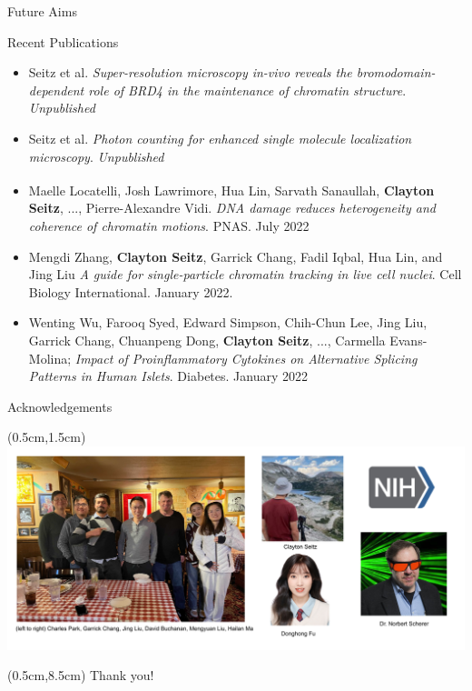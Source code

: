 \documentclass{beamer}					%
\begin{document}
\begin{frame}{Future Aims}

\end{frame}

\begin{frame}{Recent Publications}

\begin{itemize}
\item Seitz et al. \textit{Super-resolution microscopy in-vivo reveals the bromodomain-dependent role of BRD4 in the maintenance of chromatin structure}. \textit{Unpublished}

\item Seitz et al. \textit{Photon counting for enhanced single molecule localization microscopy}. \textit{Unpublished}

\item Maelle Locatelli\textsuperscript{\textdagger}, Josh Lawrimore\textsuperscript{\textdagger}, Hua Lin\textsuperscript{\textdagger}, Sarvath Sanaullah, \textbf{Clayton Seitz}, ..., Pierre-Alexandre Vidi. \textit{DNA damage reduces heterogeneity and coherence of chromatin motions}. PNAS. July 2022\\
\vspace{0.1in}
\item Mengdi Zhang, \textbf{Clayton Seitz}, Garrick Chang, Fadil Iqbal, Hua Lin, and Jing Liu \textit{A guide for single-particle chromatin tracking in live cell nuclei}. Cell Biology International. January 2022.\\
\vspace{0.1in}
\item Wenting Wu, Farooq Syed, Edward Simpson, Chih-Chun Lee, Jing Liu, Garrick Chang, Chuanpeng Dong, \textbf{Clayton Seitz}, ..., Carmella Evans-Molina; \textit{Impact of Proinflammatory Cytokines on Alternative Splicing Patterns in Human Islets}. Diabetes. January 2022
\end{itemize}
\end{frame}

\begin{frame}{Acknowledgements}
\begin{textblock*}{14cm}(0.5cm,1.5cm)
\includegraphics[width=14cm]{Lab.png}
\end{textblock*}

\begin{textblock*}{14cm}(0.5cm,8.5cm)
Thank you!
\end{textblock*}

\end{frame}
\end{document}

